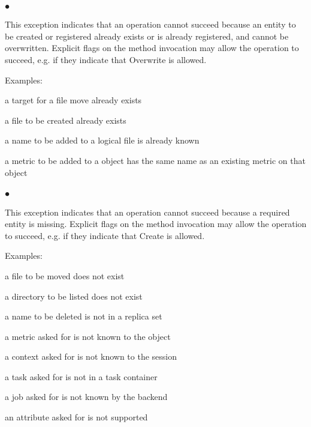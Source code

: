 
  \subsubsection*{$\bullet$ }\up
 
    This exception indicates that an operation cannot succeed
    because an entity to be created or registered already exists
    or is already registered, and cannot be overwritten.
    Explicit flags on the method invocation may allow the
    operation to succeed, e.g. if they indicate that Overwrite
    is allowed.
 
    Examples:
 
    \begin{shortlist}
     \item a target  for a file move already exists
     \item a file    to be created already exists
     \item a name    to be added to a logical file is already 
           known
     \item a metric  to be added to a object has the same name 
           as an existing metric on that object
    \end{shortlist}
 
 
  \subsubsection*{$\bullet$ }\up
 
    This exception indicates that an operation cannot succeed
    because a required entity is missing.  Explicit flags on the
    method invocation may allow the operation to succeed, e.g.
    if they indicate that Create is allowed.
 
    Examples:
 
    \begin{shortlist}
     \item a file      to be moved  does not exist
     \item a directory to be listed does not exist
     \item a name      to be deleted    is not in a replica set
     \item a metric    asked for is not known to the object
     \item a context   asked for is not known to the session
     \item a task      asked for is not in a task container
     \item a job       asked for is not known by the backend
     \item an attribute asked for is not supported
    \end{shortlist}
 
